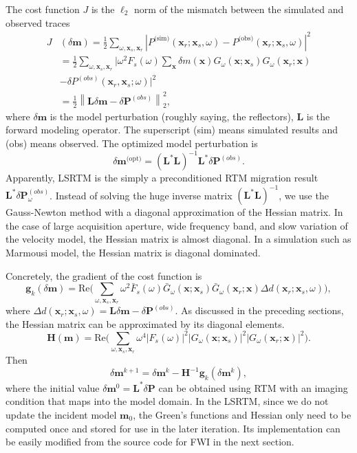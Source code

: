 \documentclass[11pt,titlepage]{article}
\newcommand{\bx}{\boldsymbol{x}}
\newcommand{\bg}{\boldsymbol{g}}
\newcommand{\bH}{\boldsymbol{H}}
\newcommand{\bL}{\boldsymbol{L}}
\newcommand{\bm}{\boldsymbol{m}}
\newcommand{\bP}{\boldsymbol{P}}
\theoremstyle{plain}
\theoremstyle{definition}
\theoremstyle{remark}
\numberwithin{equation}{section}
\begin{document}
The cost function $J$ is the $\ell_2$ norm of the mismatch between the simulated and observed traces
  \begin{equation}
  \begin{aligned}
  J&(\delta \bm) = \frac{1}{2} \sum\limits_{\omega,\bx_s,\bx_r}  \left| P^{\text{(sim)}}(\bx_r; \bx_s,  \omega) - P^{\text{(obs)}}(\bx_r; \bx_s, \omega) \right|^2 \\
  &= \frac{1}{2} \sum\limits_{\omega,\bx_s,\bx_r} \Big| \omega^2 F_s(\omega) \sum\limits_{\bx}\delta m(\bx)G_{\omega}(\bx; \bx_s)G_{\omega}(\bx_r; \bx) \\&- \delta P^{(obs)}(\bx_r, \bx_s; \omega) \Big|^2\\
  &= \frac{1}{2} \left\| \bL\delta \bm - \delta\bP^{(obs)}\right\|_2^2,
  \end{aligned}
  \end{equation}
where $\delta \bm$ is the model perturbation (roughly saying, the reflectors), $\bL$ is the forward modeling operator. The superscript (sim) means simulated results and (obs) means observed. The optimized model perturbation is 
    \begin{equation}
    \delta \bm^{\text{(opt)}} = \left( \bL^{*}\bL \right)^{-1} \bL^{*} \delta\bP^{(obs)}.
    \end{equation}
Apparently, LSRTM is the simply a preconditioned RTM migration result $\bL^{*}\delta \bP^{(obs)}_{\omega}$. Instead of solving the huge inverse matrix $(\bL^{*}\bL)^{-1}$,  we use the Gauss-Newton method with a diagonal approximation of the Hessian matrix. In the case of large acquisition aperture, wide frequency band, and slow variation of the velocity model, the Hessian matrix is almost diagonal. In a simulation such as Marmousi model, the Hessian matrix is diagonal dominated. 

Concretely, the gradient of the cost function is
\begin{equation}
\bg_k(\delta\bm)=\text{Re}\bigg(\sum_{\omega,\bx_s,\bx_r } \omega^2  \bar{F}_s(\omega) \bar{G}_\omega(\bx;\bx_s)\bar{ G}_\omega(\bx_r;\bx)\Delta d(\bx_r;\bx_s,\omega)\bigg), 
\end{equation}
where $\Delta d(\bx_r;\bx_s,\omega)=\bL\delta \bm - \delta\bP^{(obs)}$. 
As discussed in the preceding sections, the Hessian matrix can be approximated by its diagonal elements.
\begin{equation}
\bH(\bm)= \text{Re}\bigg( \sum_{\omega,\bx_s,\bx_r} \omega^4 |F_s(\omega)|^2 |G_\omega(\bx;\bx_s)|^2 |G_\omega(\bx_r;\bx)|^2 \bigg).
\end{equation} 
Then
\begin{equation}
\delta \bm^{k+1}=\delta \bm^{k} - \bH^{-1} \bg_k(\delta \bm^k),
\end{equation}
where the initial value $\delta \bm^0=\bL^* \delta \bP$ can be obtained using RTM with an imaging condition that maps into the model domain. In the LSRTM, since we do not update the incident model $\bm_0$, the Green's functions and Hessian only need to be computed once and stored for use in the later iteration. Its implementation can be easily modified from the source code for FWI in the next section.
\end{document}

